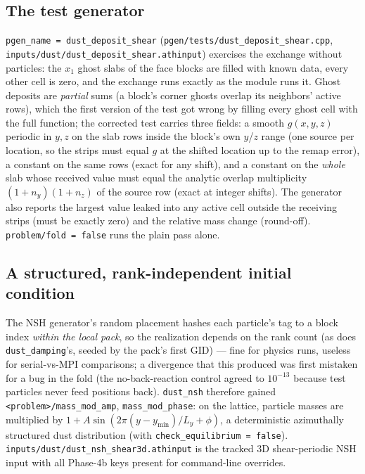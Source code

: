 \documentclass[11pt]{article}
\newcommand{\code}[1]{\texttt{#1}}
\newcommand{\file}[1]{\texttt{\small #1}}
\begin{document}
\subsection{The test generator}
\label{sec:phase4b1test}

\code{pgen\_name = dust\_deposit\_shear} (\file{pgen/tests/dust\_deposit\_shear.cpp},
\file{inputs/dust/dust\_deposit\_shear.athinput}) exercises the exchange without
particles: the $x_1$ ghost slabs of the face blocks are filled with known data, every
other cell is zero, and the exchange runs exactly as the module runs it. Ghost deposits
are \emph{partial} sums (a block's corner ghosts overlap its neighbors' active rows),
which the first version of the test got wrong by filling every ghost cell with the full
function; the corrected test carries three fields: a smooth $g(x,y,z)$ periodic in $y,z$
on the slab rows inside the block's own $y$/$z$ range (one source per location, so the
strips must equal $g$ at the shifted location up to the remap error), a constant on the
same rows (exact for any shift), and a constant on the \emph{whole} slab whose received
value must equal the analytic overlap multiplicity $(1 + n_y)(1 + n_z)$ of the source
row (exact at integer shifts). The generator also reports the largest value leaked into
any active cell outside the receiving strips (must be exactly zero) and the relative
mass change (round-off). \code{problem/fold = false} runs the plain pass alone.

\subsection{A structured, rank-independent initial condition}

The NSH generator's random placement hashes each particle's tag to a block index
\emph{within the local pack}, so the realization depends on the rank count (as does
\code{dust\_damping}'s, seeded by the pack's first GID) --- fine for physics runs,
useless for serial-vs-MPI comparisons; a divergence that this produced was first
mistaken for a bug in the fold (the no-back-reaction control agreed to $10^{-13}$
because test particles never feed positions back). \code{dust\_nsh} therefore gained
\code{<problem>/mass\_mod\_amp}, \code{mass\_mod\_phase}: on the lattice, particle
masses are multiplied by $1 + A\sin(2\pi (y - y_{\min})/L_y + \phi)$, a deterministic
azimuthally structured dust distribution (with \code{check\_equilibrium = false}).
\file{inputs/dust/dust\_nsh\_shear3d.athinput} is the tracked 3D shear-periodic NSH
input with all Phase-4b keys present for command-line overrides.
\end{document}
